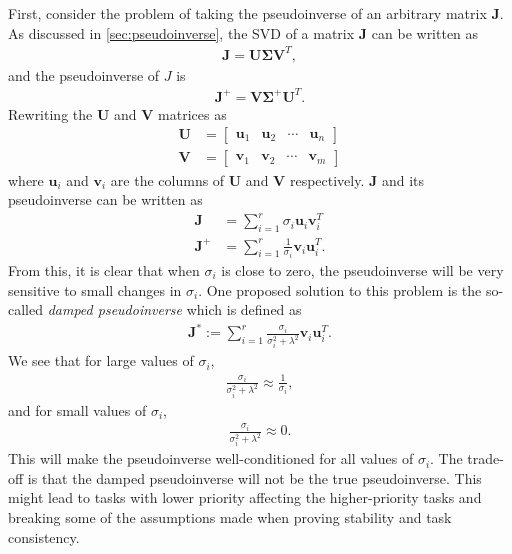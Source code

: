 First, consider the problem of taking the pseudoinverse of an arbitrary matrix $\bm{J}$.
As discussed in \autoref{sec:pseudoinverse}, the SVD of a matrix $\bm{J}$ can be
written as
\begin{align}
    \bm{J} = \bm{U} \bm{\Sigma} \bm{V}^T,
\end{align}
and the pseudoinverse of $J$ is
\begin{align}
    \bm{J}^+ = \bm{V} \bm{\Sigma}^+ \bm{U}^T.
\end{align}
Rewriting the $\bm{U}$ and $\bm{V}$ matrices as
\begin{subequations}
\begin{align}
    \bm{U} &= \begin{bmatrix} \bm{u}_1 & \bm{u}_2 & \cdots & \bm{u}_n \end{bmatrix} \\
    \bm{V} &= \begin{bmatrix} \bm{v}_1 & \bm{v}_2 & \cdots & \bm{v}_m \end{bmatrix}
\end{align}
\end{subequations}
where $\bm{u}_i$ and $\bm{v}_i$ are the columns of $\bm{U}$ and $\bm{V}$ respectively.
$\bm{J}$ and its pseudoinverse can be written as
\begin{subequations}
\begin{align}
    \bm{J} &= \sum_{i=1}^r \sigma_i \bm{u}_i \bm{v}_i^T \\
    \bm{J}^+ &= \sum_{i=1}^r \frac{1}{\sigma_i} \bm{v}_i \bm{u}_i^T.
\end{align}
\end{subequations}
From this, it is clear that when $\sigma_i$ is close to zero, the pseudoinverse
will be very sensitive to small changes in $\sigma_i$. One proposed solution to
this problem is the so-called \emph{damped pseudoinverse} which is defined as
\begin{align}
    \bm{J}^* := \sum_{i=1}^r \frac{\sigma_i}{\sigma_i^2 + \lambda^2} \bm{v}_i \bm{u}_i^T.
\end{align}
We see that for large values of $\sigma_i$,
\begin{align}
    \frac{\sigma_i}{\sigma_i^2 + \lambda^2} \approx \frac{1}{\sigma_i},
\end{align}
and for small values of $\sigma_i$,
\begin{align}
    \frac{\sigma_i}{\sigma_i^2 + \lambda^2} \approx 0.
\end{align}
This will make the pseudoinverse well-conditioned for all values of $\sigma_i$.
The trade-off is that the damped pseudoinverse will not be the true pseudoinverse.
This might lead to tasks with lower priority affecting the higher-priority tasks and
breaking some of the assumptions made when proving stability and task consistency.

